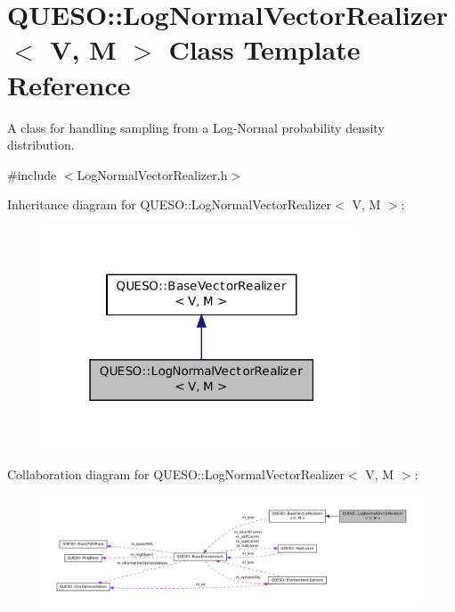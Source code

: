 \hypertarget{class_q_u_e_s_o_1_1_log_normal_vector_realizer}{\section{Q\-U\-E\-S\-O\-:\-:Log\-Normal\-Vector\-Realizer$<$ V, M $>$ Class Template Reference}
\label{class_q_u_e_s_o_1_1_log_normal_vector_realizer}
}


A class for handling sampling from a Log-\/\-Normal probability density distribution.  




{\ttfamily \#include $<$Log\-Normal\-Vector\-Realizer.\-h$>$}



Inheritance diagram for Q\-U\-E\-S\-O\-:\-:Log\-Normal\-Vector\-Realizer$<$ V, M $>$\-:
\nopagebreak
\begin{figure}[H]
\begin{center}
\leavevmode
\includegraphics[width=268pt]{class_q_u_e_s_o_1_1_log_normal_vector_realizer__inherit__graph}
\end{center}
\end{figure}


Collaboration diagram for Q\-U\-E\-S\-O\-:\-:Log\-Normal\-Vector\-Realizer$<$ V, M $>$\-:
\nopagebreak
\begin{figure}[H]
\begin{center}
\leavevmode
\includegraphics[width=350pt]{class_q_u_e_s_o_1_1_log_normal_vector_realizer__coll__graph}
\end{center}
\end{figure}
